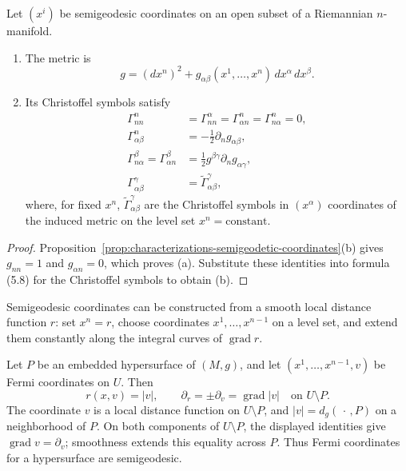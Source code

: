 \begin{corollary}
\label{cor:semigeodesic-metric-christoffel}


Let $(x^i)$ be semigeodesic coordinates on an open subset of a Riemannian
$n$-manifold.
\begin{enumerate}
\item[(a)] The metric is
\[
g=(dx^n)^2+g_{\alpha\beta}(x^1,\ldots,x^n)\,dx^\alpha\,dx^\beta.
\]
\item[(b)] Its Christoffel symbols satisfy
\begin{align*}
\Gamma^n_{nn}&=\Gamma^\alpha_{nn}=\Gamma^n_{\alpha n}
=\Gamma^n_{n\alpha}=0,\\
\Gamma^n_{\alpha\beta}&=-\frac12\partial_ng_{\alpha\beta},\\
\Gamma^\beta_{n\alpha}=\Gamma^\beta_{\alpha n}
&=\frac12g^{\beta\gamma}\partial_ng_{\alpha\gamma},\\
\Gamma^\gamma_{\alpha\beta}&=\widetilde\Gamma^\gamma_{\alpha\beta},
\end{align*}
where, for fixed $x^n$, $\widetilde\Gamma^\gamma_{\alpha\beta}$ are the
Christoffel symbols in $(x^\alpha)$ coordinates of the induced metric on the
level set $x^n=\text{constant}$.
\end{enumerate}
\end{corollary}

\begin{proof}
\sketch Proposition~\ref{prop:characterizations-semigeodetic-coordinates}(b)
gives $g_{nn}=1$ and $g_{\alpha n}=0$, which proves (a). Substitute these
identities into formula (5.8) for the Christoffel symbols to obtain (b).
\end{proof}

Semigeodesic coordinates can be constructed from a smooth local distance
function $r$: set $x^n=r$, choose coordinates $x^1,\ldots,x^{n-1}$ on a level
set, and extend them constantly along the integral curves of
$\operatorname{grad}r$.

\begin{example}
\label{ex:fermi-coordinates-hypersurface}


Let $P$ be an embedded hypersurface of $(M,g)$, and let
$(x^1,\ldots,x^{n-1},v)$ be Fermi coordinates on $U$. Then
\[
r(x,v)=|v|,
\qquad
\partial_r=\pm\partial_v=\operatorname{grad}|v|
\quad\text{on }U\setminus P.
\]
The coordinate $v$ is a local distance function on $U\setminus P$, and
$|v|=d_g(\,\cdot\,,P)$ on a neighborhood of $P$. On both components of
$U\setminus P$, the displayed identities give
$\operatorname{grad}v=\partial_v$; smoothness extends this equality across
$P$. Thus Fermi coordinates for a hypersurface are semigeodesic.
\end{example}

